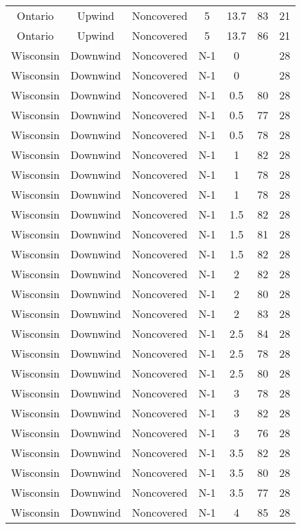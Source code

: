\documentclass{article}
\begin{document}
\begin{longtable}[H]{ccccccc}
Ontario & Upwind   & Noncovered & 5 & 13.7 & 83  & 21 \\
Ontario & Upwind   & Noncovered & 5 & 13.7 & 86  & 21 \\
Wisconsin & Downwind & Noncovered & N-1 & 0    &     & 28 \\
Wisconsin & Downwind & Noncovered & N-1 & 0    &     & 28 \\
Wisconsin & Downwind & Noncovered & N-1 & 0.5  & 80  & 28 \\
Wisconsin & Downwind & Noncovered & N-1 & 0.5  & 77  & 28 \\
Wisconsin & Downwind & Noncovered & N-1 & 0.5  & 78  & 28 \\
Wisconsin & Downwind & Noncovered & N-1 & 1    & 82  & 28 \\
Wisconsin & Downwind & Noncovered & N-1 & 1    & 78  & 28 \\
Wisconsin & Downwind & Noncovered & N-1 & 1    & 78  & 28 \\
Wisconsin & Downwind & Noncovered & N-1 & 1.5  & 82  & 28 \\
Wisconsin & Downwind & Noncovered & N-1 & 1.5  & 81  & 28 \\
Wisconsin & Downwind & Noncovered & N-1 & 1.5  & 82  & 28 \\
Wisconsin & Downwind & Noncovered & N-1 & 2    & 82  & 28 \\
Wisconsin & Downwind & Noncovered & N-1 & 2    & 80  & 28 \\
Wisconsin & Downwind & Noncovered & N-1 & 2    & 83  & 28 \\
Wisconsin & Downwind & Noncovered & N-1 & 2.5  & 84  & 28 \\
Wisconsin & Downwind & Noncovered & N-1 & 2.5  & 78  & 28 \\
Wisconsin & Downwind & Noncovered & N-1 & 2.5  & 80  & 28 \\
Wisconsin & Downwind & Noncovered & N-1 & 3    & 78  & 28 \\
Wisconsin & Downwind & Noncovered & N-1 & 3    & 82  & 28 \\
Wisconsin & Downwind & Noncovered & N-1 & 3    & 76  & 28 \\
Wisconsin & Downwind & Noncovered & N-1 & 3.5  & 82  & 28 \\
Wisconsin & Downwind & Noncovered & N-1 & 3.5  & 80  & 28 \\
Wisconsin & Downwind & Noncovered & N-1 & 3.5  & 77  & 28 \\
Wisconsin & Downwind & Noncovered & N-1 & 4    & 85  & 28 \\

\end{longtable}
\end{document}
